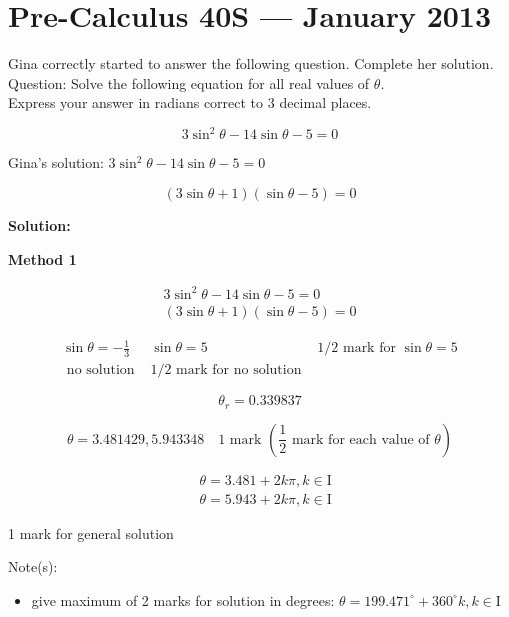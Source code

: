 \documentclass[12pt,addpoints,answers]{exam}
\begin{document}
\section*{Pre-Calculus 40S --- January 2013}

\begin{questions}

\question
\leavevmode
Gina correctly started to answer the following question. Complete her solution.\\
Question: Solve the following equation for all real values of $\theta$.\\
Express your answer in radians correct to 3 decimal places.

$$
3 \sin ^{2} \theta-14 \sin \theta-5=0
$$

Gina's solution: $3 \sin ^{2} \theta-14 \sin \theta-5=0$

$$
(3 \sin \theta+1)(\sin \theta-5)=0
$$
\begin{solution}
\textbf{Solution:}\par

\textbf{Method 1}\par
$$
\begin{array}{r}
3 \sin ^{2} \theta-14 \sin \theta-5=0 \\
(3 \sin \theta+1)(\sin \theta-5)=0
\end{array}
$$

$$
\begin{array}{lll}
\sin \theta=-\frac{1}{3} & \sin \theta=5 & 1 / 2 \text { mark for } \sin \theta=5 \\
\text { no solution } & 1 / 2 \text { mark for no solution }
\end{array}
$$

$$
\theta_{r}=0.339837
$$

$$
\theta=3.481429,5.943348 \quad 1 \text { mark }\left(\frac{1}{2} \text { mark for each value of } \theta\right)
$$

$$
\begin{aligned}
& \theta=3.481+2 k \pi, k \in \mathrm{I} \\
& \theta=5.943+2 k \pi, k \in \mathrm{I}
\end{aligned}
$$

1 mark for general solution

Note(s):

\begin{itemize}
  \item give maximum of 2 marks for solution in degrees: $\theta=199.471^{\circ}+360^{\circ} k, k \in \mathrm{I}$
\end{itemize}


\end{solution}
\end{questions}
\end{document}

